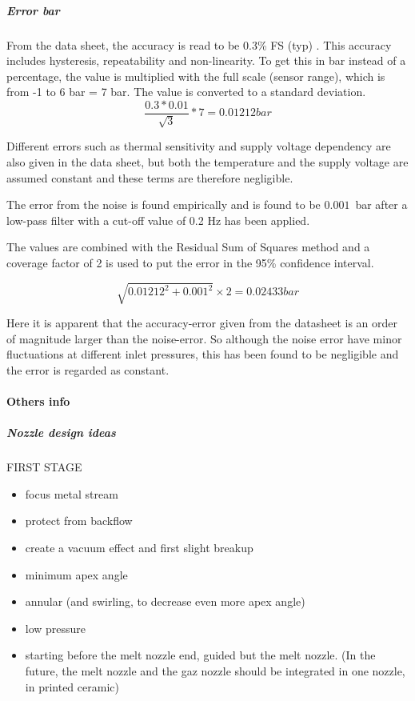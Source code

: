 \documentclass[../../../main.tex]{subfiles}
\begin{document}
\subparagraph{Error bar}
From the data sheet, the accuracy is read to be 0.3\% FS (typ) \cite{device.reportPressureTransmitter}. This accuracy includes hysteresis, repeatability and non-linearity. To get this in bar instead of a percentage, the value is multiplied with the full scale (sensor range), which is from -1 to 6 bar = 7 bar. The value is converted to a standard deviation.
\begin{equation}
    \frac{0.3*0.01}{\sqrt{3}}*7 = 0.01212 bar
\end{equation}

Different errors such as thermal sensitivity and supply voltage dependency are also given in the data sheet, but both the temperature and the supply voltage are assumed constant and these terms are therefore negligible.

The error from the noise is found empirically and is found to be $0.001$~bar after a low-pass filter with a cut-off value of 0.2 Hz has been applied.

The values are combined with the Residual Sum of Squares method and a coverage factor of 2 is used to put the error in the 95\% confidence interval.

\begin{equation}
    \sqrt{0.01212^2 + 0.001^2} \times2 = 0.02433 bar
\end{equation}

Here it is apparent that the accuracy-error given from the datasheet is an order of magnitude larger than the noise-error. So although the noise error have minor fluctuations at different inlet pressures, this has been found to be negligible and the error is regarded as constant.

\paragraph{Others info}

\subparagraph{Nozzle design ideas}

\vspace{0mm}
\begin{minipage}{\linewidth}
    FIRST STAGE
        \begin{itemize}
        \item[$\Rightarrow$] focus metal stream
        \item[$\Rightarrow$] protect from backflow
        \item[$\Rightarrow$] create a vacuum effect and first slight breakup
        \end{itemize}
            \begin{itemize}
            \item minimum apex angle
            \item annular (and swirling, to decrease even more apex angle)
            \item low pressure
            \item starting before the melt nozzle end, guided but the melt nozzle. (In the future, the melt nozzle and the gaz nozzle should be integrated in one nozzle, in printed ceramic)
            \end{itemize}
\end{minipage}
\vspace{5mm}
\end{document}
